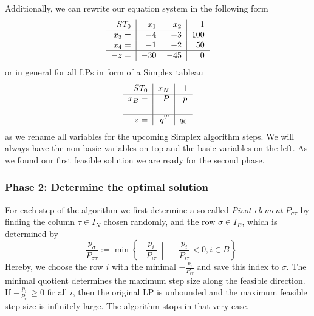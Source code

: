 \documentclass[a4paper, 11pt]{article}
\begin{document}
Additionally, we can rewrite our equation system in the following form
\begin{equation*}
	\begin{tabular}{r|rr|r}
		$ST_0$&$x_1$&$x_2$&$1$\\
		\hline
		$x_3=$&$-4$&$-3$&$100$\\
		$x_4=$&$-1$&$-2$&$50$\\
		\hline
		$-z=$&$-30$&$-45$&$0$
	\end{tabular}
\end{equation*}
or in general for all LPs in form of a Simplex tableau
\begin{equation}
	\begin{tabular}{r|r|r}
		$ST_0$&$x_N$&$1$\\
		\hline
		$x_B=$&$P$&$p$\\
		&&\\
		\hline
		$z=$&$q^T$&$q_0$
	\end{tabular}
\end{equation}
as we rename all variables for the upcoming Simplex algorithm steps. We will always have the non-basic variables on top and the basic variables on the left. As we found our first feasible solution we are ready for the second phase.

\subsubsection{Phase 2: Determine the optimal solution}

For each step of the algorithm we first determine a so called \textit{Pivot element} $P_{\sigma\tau}$ by finding the column $\tau\in I_N$ chosen randomly, and the row $\sigma\in I_B$, which is determined by
\begin{equation}
	- \dfrac{p_\sigma}{P_{\sigma\tau}} := \min \left\{ -\frac{p_i}{P_{i\tau}}\ \middle|\ -\frac{p_i}{P_{i\tau}} < 0, i\in B \right\}
\end{equation} 
Hereby, we choose the row $i$ with the minimal $-\frac{p_i}{P_{i\tau}}$ and save this index to $\sigma$. The minimal quotient determines the maximum step size along the feasible direction. If $-\frac{p_i}{P_{i\tau}}\geq 0$ fir all $i$, then the original LP is unbounded and the maximum feasible step size is infinitely large. The algorithm stops in that very case. \\
\end{document}
